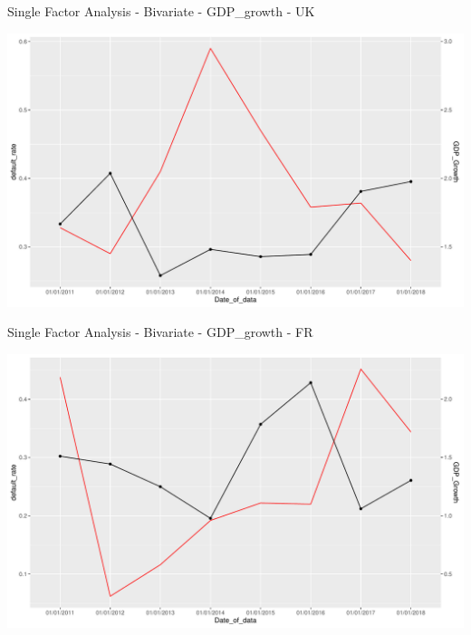 \documentclass[9pt,ignorenonframetext,]{beamer}
\begin{document}
\begin{frame}{Single Factor Analysis - Bivariate - GDP\_growth - UK}

\includegraphics{Risk-Models-Development-Process_files/figure-beamer/unnamed-chunk-40-1.pdf}

\end{frame}

\begin{frame}{Single Factor Analysis - Bivariate - GDP\_growth - FR}

\includegraphics{Risk-Models-Development-Process_files/figure-beamer/unnamed-chunk-41-1.pdf}

\end{frame}
\end{document}
